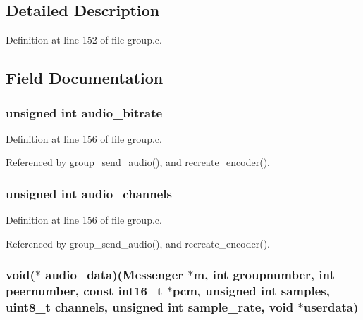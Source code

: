 \subsection{Detailed Description}


Definition at line 152 of file group.\+c.



\subsection{Field Documentation}
\hypertarget{struct_group___a_v_a1e39921527f07befd08d913c63b397a9}{
\subsubsection[{audio\+\_\+bitrate}]{\setlength{\rightskip}{0pt plus 5cm}unsigned int audio\+\_\+bitrate}}\label{struct_group___a_v_a1e39921527f07befd08d913c63b397a9}


Definition at line 156 of file group.\+c.



Referenced by group\+\_\+send\+\_\+audio(), and recreate\+\_\+encoder().

\hypertarget{struct_group___a_v_a7b6aa0a517a158485dccd6ce0a916e0e}{
\subsubsection[{audio\+\_\+channels}]{\setlength{\rightskip}{0pt plus 5cm}unsigned int audio\+\_\+channels}}\label{struct_group___a_v_a7b6aa0a517a158485dccd6ce0a916e0e}


Definition at line 156 of file group.\+c.



Referenced by group\+\_\+send\+\_\+audio(), and recreate\+\_\+encoder().

\hypertarget{struct_group___a_v_a2ae2d081bbdd51062bcb82ea4a55eec5}{
\subsubsection[{audio\+\_\+data}]{\setlength{\rightskip}{0pt plus 5cm}void($\ast$ audio\+\_\+data)({\bf Messenger} $\ast${\bf m}, int groupnumber, int peernumber, const int16\+\_\+t $\ast$pcm, unsigned int samples, uint8\+\_\+t channels, unsigned int sample\+\_\+rate, void $\ast${\bf userdata})}}\label{struct_group___a_v_a2ae2d081bbdd51062bcb82ea4a55eec5}


